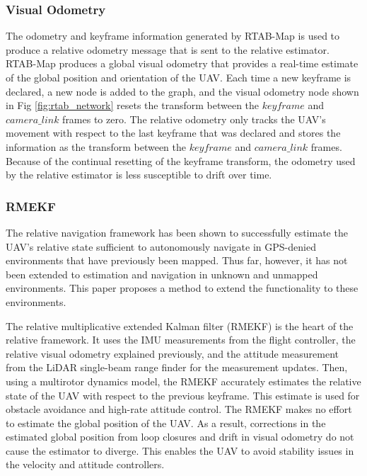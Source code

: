 \documentclass[letterpaper, 10 pt, conference]{ieeeconf}  %
\begin{document}
\subsubsection{Visual Odometry} \label{vis_odom}

The odometry and keyframe information generated by RTAB-Map is used to produce a relative odometry message that is sent to the relative estimator. RTAB-Map produces a global visual odometry that provides a real-time estimate of the global position and orientation of the UAV. Each time a new keyframe is declared, a new node is added to the graph, and the visual odometry node shown in Fig \ref{fig:rtab_network} resets the transform between the $\mathit{keyframe}$ and $\mathit{camera\_link}$ frames to zero. The relative odometry only tracks the UAV's movement with respect to the last keyframe that was declared and stores the information as the transform between the $\mathit{keyframe}$ and $\mathit{camera\_link}$ frames. Because of the continual resetting of the keyframe transform, the odometry used by the relative estimator is less susceptible to drift over time.

\subsubsection{RMEKF}

The relative navigation framework \cite{Wheeler2017,Wheeler2018,Koch2017} has been shown to successfully estimate the UAV's relative state sufficient to autonomously navigate in GPS-denied environments that have previously been mapped. Thus far, however, it has not been extended to estimation and navigation in unknown and unmapped environments. This paper proposes a method to extend the functionality to these environments.

The relative multiplicative extended Kalman filter (RMEKF) is the heart of the relative framework. It uses the IMU measurements from the flight controller, the relative visual odometry explained previously, and the attitude measurement from the LiDAR single-beam range finder for the measurement updates. Then, using a multirotor dynamics model, the RMEKF accurately estimates the relative state of the UAV with respect to the previous keyframe. This estimate is used for obstacle avoidance and high-rate attitude control. The RMEKF makes no effort to estimate the global position of the UAV. As a result, corrections in the estimated global position from loop closures and drift in visual odometry do not cause the estimator to diverge. This enables the UAV to avoid stability issues in the velocity and attitude controllers.
\end{document}

